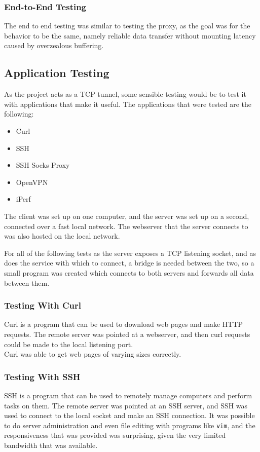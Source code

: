 \subsubsection*{End-to-End Testing}
The end to end testing was similar to testing the proxy, as the goal was for the behavior to be the same, namely reliable data transfer without mounting latency caused by overzealous buffering.

\subsection{Application Testing}
As the project acts as a TCP tunnel, some sensible testing would be to test it with applications that make it useful.
The applications that were tested are the following:
\begin{itemize}
    \item Curl
    \item SSH
    \item SSH Socks Proxy
    \item OpenVPN
    \item iPerf
\end{itemize}

The client was set up on one computer, and the server was set up on a second, connected over a fast local network.
The webserver that the server connects to was also hosted on the local network.\par

For all of the following tests as the server exposes a TCP listening socket, and as does the service with which to connect, a bridge is needed between the two, so a small program was created which connects to both servers and forwards all data between them.

\subsubsection*{Testing With Curl}
Curl is a program that can be used to download web pages and make HTTP requests.
The remote server was pointed at a webserver, and then curl requests could be made to the local listening port.\\
Curl was able to get web pages of varying sizes correctly.

\subsubsection*{Testing With SSH}
SSH is a program that can be used to remotely manage computers and perform tasks on them.
The remote server was pointed at an SSH server, and SSH was used to connect to the local socket and make an SSH connection.
It was possible to do server administration and even file editing with programs like \texttt{vim}, and the responsiveness that was provided was surprising, given the very limited bandwidth that was available.

